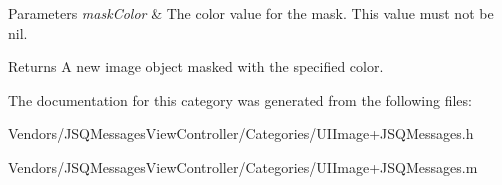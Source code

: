 \begin{DoxyParams}{Parameters}
{\em mask\+Color} & The color value for the mask. This value must not be {\ttfamily nil}.\\
\hline
\end{DoxyParams}
\begin{DoxyReturn}{Returns}
A new image object masked with the specified color. 
\end{DoxyReturn}


The documentation for this category was generated from the following files\+:\begin{DoxyCompactItemize}
\item 
Vendors/\+J\+S\+Q\+Messages\+View\+Controller/\+Categories/U\+I\+Image+\+J\+S\+Q\+Messages.\+h\item 
Vendors/\+J\+S\+Q\+Messages\+View\+Controller/\+Categories/U\+I\+Image+\+J\+S\+Q\+Messages.\+m\end{DoxyCompactItemize}
